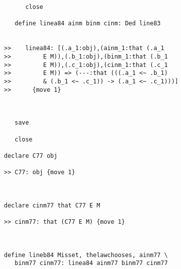 \documentclass[12pt]{article}
\begin{document}
\begin{verbatim}
      close

   define linea84 ainm binm cinm: Ded line83


>>    linea84: [(.a_1:obj),(ainm_1:that (.a_1
>>         E M)),(.b_1:obj),(binm_1:that (.b_1
>>         E M)),(.c_1:obj),(cinm_1:that (.c_1
>>         E M)) => (---:that (((.a_1 <~ .b_1)
>>         & (.b_1 <~ .c_1)) -> (.a_1 <~ .c_1)))]
>>      {move 1}



   save

   close

declare C77 obj

>> C77: obj {move 1}



declare cinm77 that C77 E M

>> cinm77: that (C77 E M) {move 1}



define lineb84 Misset, thelawchooses, ainm77 \
   binm77 cinm77: linea84 ainm77 binm77 cinm77



\end{verbatim}
\end{document}
